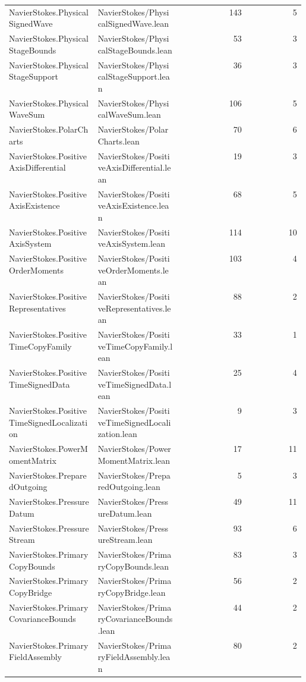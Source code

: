 \begin{longtable}{p{0.30\linewidth}p{0.28\linewidth}rr}
NavierStokes.PhysicalSignedWave & NavierStokes/PhysicalSignedWave.lean & 143 & 5\\
NavierStokes.PhysicalStageBounds & NavierStokes/PhysicalStageBounds.lean & 53 & 3\\
NavierStokes.PhysicalStageSupport & NavierStokes/PhysicalStageSupport.lean & 36 & 3\\
NavierStokes.PhysicalWaveSum & NavierStokes/PhysicalWaveSum.lean & 106 & 5\\
NavierStokes.PolarCharts & NavierStokes/PolarCharts.lean & 70 & 6\\
NavierStokes.PositiveAxisDifferential & NavierStokes/PositiveAxisDifferential.lean & 19 & 3\\
NavierStokes.PositiveAxisExistence & NavierStokes/PositiveAxisExistence.lean & 68 & 5\\
NavierStokes.PositiveAxisSystem & NavierStokes/PositiveAxisSystem.lean & 114 & 10\\
NavierStokes.PositiveOrderMoments & NavierStokes/PositiveOrderMoments.lean & 103 & 4\\
NavierStokes.PositiveRepresentatives & NavierStokes/PositiveRepresentatives.lean & 88 & 2\\
NavierStokes.PositiveTimeCopyFamily & NavierStokes/PositiveTimeCopyFamily.lean & 33 & 1\\
NavierStokes.PositiveTimeSignedData & NavierStokes/PositiveTimeSignedData.lean & 25 & 4\\
NavierStokes.PositiveTimeSignedLocalization & NavierStokes/PositiveTimeSignedLocalization.lean & 9 & 3\\
NavierStokes.PowerMomentMatrix & NavierStokes/PowerMomentMatrix.lean & 17 & 11\\
NavierStokes.PreparedOutgoing & NavierStokes/PreparedOutgoing.lean & 5 & 3\\
NavierStokes.PressureDatum & NavierStokes/PressureDatum.lean & 49 & 11\\
NavierStokes.PressureStream & NavierStokes/PressureStream.lean & 93 & 6\\
NavierStokes.PrimaryCopyBounds & NavierStokes/PrimaryCopyBounds.lean & 83 & 3\\
NavierStokes.PrimaryCopyBridge & NavierStokes/PrimaryCopyBridge.lean & 56 & 2\\
NavierStokes.PrimaryCovarianceBounds & NavierStokes/PrimaryCovarianceBounds.lean & 44 & 2\\
NavierStokes.PrimaryFieldAssembly & NavierStokes/PrimaryFieldAssembly.lean & 80 & 2\\

\end{longtable}
